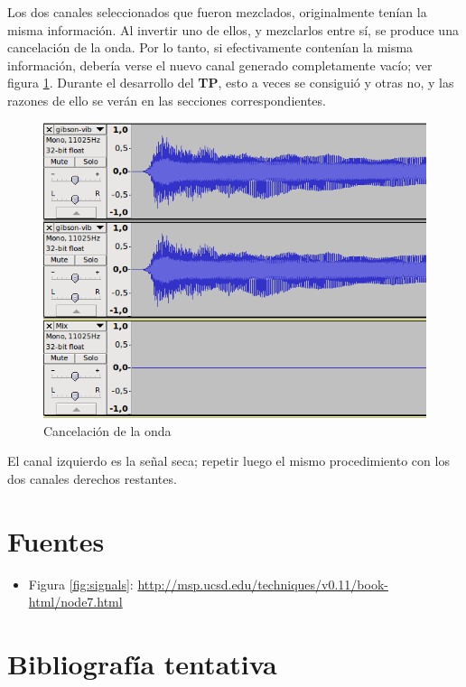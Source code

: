 \documentclass[a4paper,spanish,12pt]{article}
\begin{document}
Los dos canales seleccionados que fueron mezclados, originalmente tenían la misma información. Al invertir uno de ellos, y mezclarlos entre sí, se produce una cancelación de la onda. Por lo tanto, si efectivamente contenían la misma información, debería verse el nuevo canal generado completamente vacío; ver figura \ref{fig:audacity-no-wave}. Durante el desarrollo del \textbf{TP}, esto a veces se consiguió y otras no, y las razones de ello se verán en las secciones correspondientes.

\begin{figure}[H]
    \centering
    \includegraphics[scale=0.70]{imagenes/audacity-no-wave.png}
    \caption{Cancelación de la onda}
    \label{fig:audacity-no-wave}
\end{figure}

El canal izquierdo es la señal seca; repetir luego el mismo procedimiento con los dos canales derechos restantes.


\newpage\section{Fuentes}
\begin{itemize}
\item Figura \ref{fig:signals}: \url{http://msp.ucsd.edu/techniques/v0.11/book-html/node7.html}
\end{itemize}

\newpage\section{Bibliografía tentativa}
\end{document}
